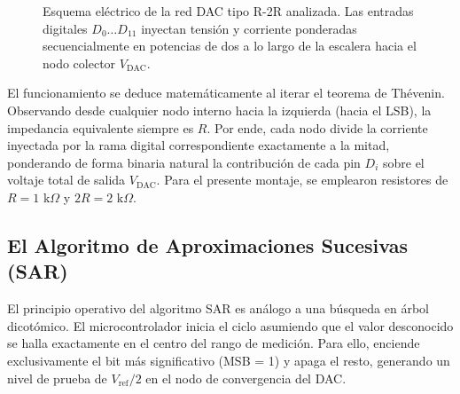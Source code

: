 \documentclass[conference]{IEEEtran}
\begin{document}
\begin{figure}[htbp]
    \centering
    \caption{Esquema eléctrico de la red DAC tipo R-2R analizada. Las entradas digitales $D_0 \dots D_{11}$ inyectan tensión y corriente ponderadas secuencialmente en potencias de dos a lo largo de la escalera hacia el nodo colector $V_{\text{DAC}}$.}\label{fig:circuito_r2r}
\end{figure}

El funcionamiento se deduce matemáticamente al iterar el teorema de Thévenin. Observando desde cualquier nodo interno hacia la izquierda (hacia el LSB), la impedancia equivalente siempre es $R$. Por ende, cada nodo divide la corriente inyectada por la rama digital correspondiente exactamente a la mitad, ponderando de forma binaria natural la contribución de cada pin $D_i$ sobre el voltaje total de salida $V_{\text{DAC}}$. Para el presente montaje, se emplearon resistores de $R = 1\text{ k}\Omega$ y $2R = 2\text{ k}\Omega$.

\subsection{El Algoritmo de Aproximaciones Sucesivas (SAR)}
El principio operativo del algoritmo SAR es análogo a una búsqueda en árbol dicotómico. El microcontrolador inicia el ciclo asumiendo que el valor desconocido se halla exactamente en el centro del rango de medición. Para ello, enciende exclusivamente el bit más significativo (MSB = 1) y apaga el resto, generando un nivel de prueba de $V_{\text{ref}}/2$ en el nodo de convergencia del DAC. 
\end{document}
